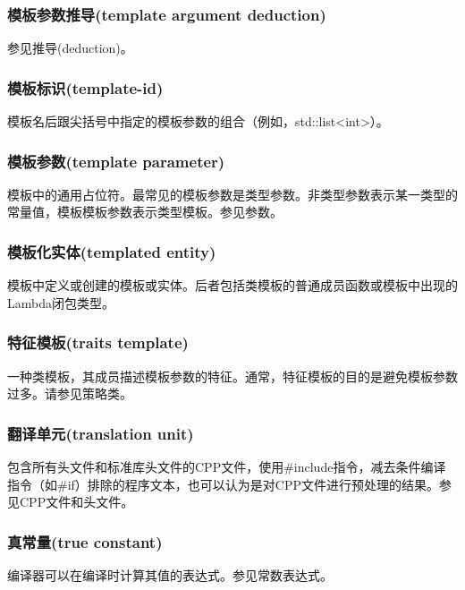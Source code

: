 \subsubsection{模板参数推导(template argument deduction)}

参见推导(deduction)。

\subsubsection{模板标识(template-id)}

模板名后跟尖括号中指定的模板参数的组合（例如，std::list<int>）。

\subsubsection{模板参数(template parameter)}

模板中的通用占位符。最常见的模板参数是类型参数。非类型参数表示某一类型的常量值，模板模板参数表示类型模板。参见参数。

\subsubsection{模板化实体(templated entity)}

模板中定义或创建的模板或实体。后者包括类模板的普通成员函数或模板中出现的Lambda闭包类型。

\subsubsection{特征模板(traits template)}

一种类模板，其成员描述模板参数的特征。通常，特征模板的目的是避免模板参数过多。请参见策略类。

\subsubsection{翻译单元(translation unit)}

包含所有头文件和标准库头文件的CPP文件，使用\#include指令，减去条件编译指令（如\#if）排除的程序文本，也可以认为是对CPP文件进行预处理的结果。参见CPP文件和头文件。

\subsubsection{真常量(true constant)}

编译器可以在编译时计算其值的表达式。参见常数表达式。

